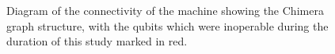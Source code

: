 \begin{figure}
	\caption[\machine Layout]{Diagram of the connectivity of the \machine machine showing the Chimera graph structure, with the qubits which were inoperable during the duration of this study marked in red.}
	\label{fig:broken_qubits}
\end{figure}
